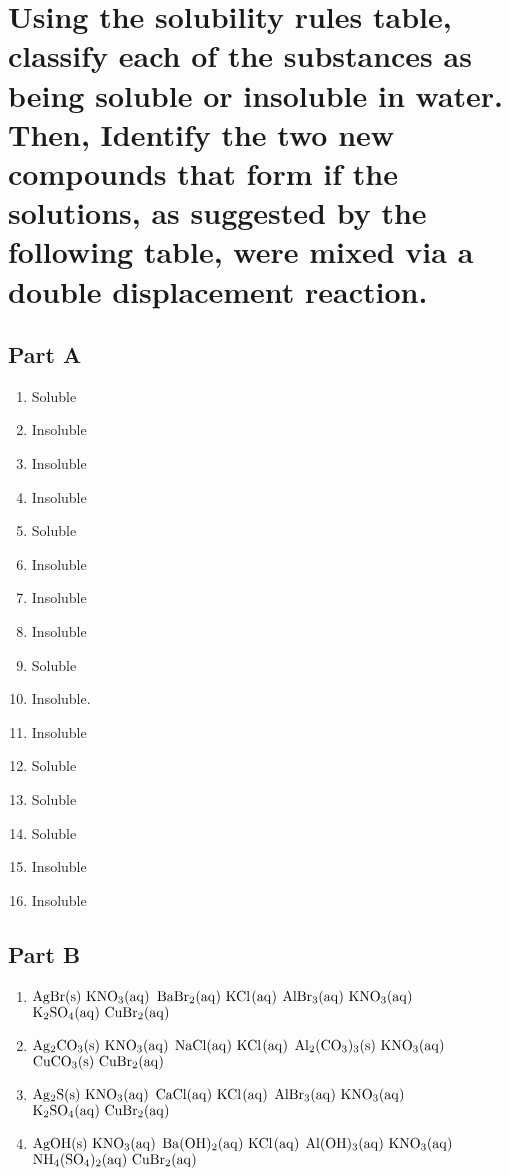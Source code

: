 \documentclass{scrartcl}
\begin{document}
\section{Using the solubility rules table, classify each of the substances as being soluble or insoluble in water. Then, Identify the two new compounds that form if the solutions, as suggested by the following table, were mixed via a double displacement reaction.}
\label{sec:org6cf11da}

\subsection{Part A}
\label{sec:org65fb7cf}
\begin{enumerate}
\item Soluble
\item Insoluble
\item Insoluble
\item Insoluble
\item Soluble
\item Insoluble
\item Insoluble
\item Insoluble
\item Soluble
\item Insoluble.
\item Insoluble
\item Soluble
\item Soluble
\item Soluble
\item Insoluble
\item Insoluble
\end{enumerate}

\subsection{Part B}
\label{sec:org053b9ca}
\begin{enumerate}
\item \(\ce{AgBr(s)\ KNO3(aq)}\)
\(\ce{BaBr2(aq)\ KCl(aq)}\)
\(\ce{AlBr3(aq)\ KNO3(aq)}\)
\(\ce{K2SO4(aq)\ CuBr2(aq)}\)

\item \(\ce{Ag2CO3(s)\ KNO3(aq)}\)
\(\ce{NaCl(aq)\ KCl(aq)}\)
\(\ce{Al2(CO3)3(s)\ KNO3(aq)}\)
\(\ce{CuCO3(s)\ CuBr2(aq)}\)

\item \(\ce{Ag2S(s)\ KNO3(aq)}\)
\(\ce{CaCl(aq)\ KCl(aq)}\)
\(\ce{AlBr3(aq)\ KNO3(aq)}\)
\(\ce{K2SO4(aq)\ CuBr2(aq)}\)

\item \(\ce{AgOH(s)\ KNO3(aq)}\)
\(\ce{Ba(OH)2(aq)\ KCl(aq)}\)
\(\ce{Al(OH)3(aq)\ KNO3(aq)}\)
\(\ce{NH4(SO4)2(aq)\ CuBr2(aq)}\)
\end{enumerate}
\end{document}

